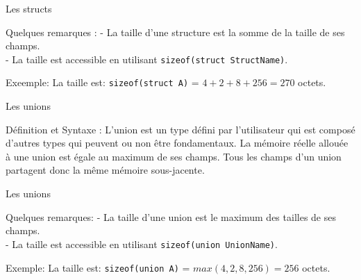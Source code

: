 \documentclass{beamer}
\begin{document}
\begin{darkframes}
  	\begin{frame}{Les structs}
  		\begin{alertblock}{Quelques remarques :}
  			- La taille d'une structure est la somme de la taille de ses champs. \\
  			- La taille est accessible en utilisant \alert{\texttt{sizeof(struct StructName)}}.
  		\end{alertblock}
  		\begin{exampleblock}{Exeemple:}
  			\structExmp
  			La taille est: \texttt{sizeof(struct A)} = $4 + 2 + 8 + 256 = 270$ octets.
  		\end{exampleblock}
  	\end{frame}
  


 
  	\begin{frame}{Les unions}
  		\begin{block}{Définition et Syntaxe :}
  			L'union est un type défini par l'utilisateur qui est composé d'autres types qui peuvent ou non être fondamentaux. La mémoire réelle allouée à une union est égale au maximum de ses champs. Tous les champs d'un union partagent donc la même mémoire sous-jacente.
  			\unionSyntax
  		\end{block}

  	\end{frame}
  	
  	\begin{frame}{Les unions}
  		\begin{alertblock}{Quelques remarques:}
  			- La taille d'une union est le maximum des tailles de ses champs. \\
  			- La taille est accessible en utilisant \alert{\texttt{sizeof(union UnionName)}}. \\
  		\end{alertblock}
  		\begin{exampleblock}{Exemple:}
  			\unionExmp
  			La taille est: \texttt{sizeof(union A)} = $max(4, 2, 8, 256) = 256$ octets.
  		\end{exampleblock}
  	\end{frame}


\end{darkframes}
\end{document}

